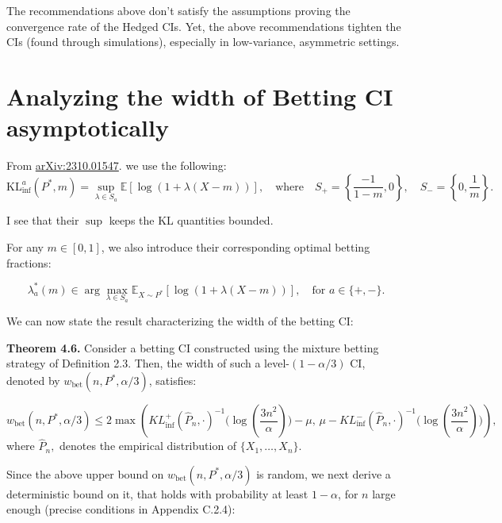 \documentclass{article}
\newcommand{\art}[1]{\begingroup\color{blue}#1\endgroup}
\renewcommand{\leq}{\leqslant}
\begin{document}
\noindent The recommendations above don't satisfy the assumptions proving the convergence rate of the Hedged CIs. Yet, the above recommendations tighten the CIs (found through simulations), especially in low-variance, asymmetric settings. 

\section{Analyzing the width of Betting CI asymptotically}

From \href{https://arxiv.org/pdf/2310.01547}{arXiv:2310.01547}. we use the following:
\setcounter{equation}{6}
\begin{equation}
\text{KL}^{a}_{\text{inf}}(P^*, m) = \sup_{\lambda \in S_a} \mathbb{E}\left[\log\left(1 + \lambda (X - m)\right)\right], \quad \text{where} \quad S_+ = \left\{ \frac{-1}{1-m},0 \right\}, \quad S_- = \left\{ 0, \frac{1}{m} \right\}.
\end{equation}

\art{I see that their $\sup$ keeps the KL quantities bounded.}

For any \( m \in [0, 1] \), we also introduce their corresponding optimal betting fractions:

\begin{equation}
\lambda^*_a(m) \in \arg \max_{\lambda \in S_a} \mathbb{E}_{X \sim P^*} \left[\log\left(1 + \lambda (X - m)\right)\right], \quad \text{for } a \in \{+, -\}. 
\end{equation}

We can now state the result characterizing the width of the betting CI:

\textbf{Theorem 4.6.} Consider a betting CI constructed using the mixture betting strategy of Definition 2.3. Then, the width of such a level-$(1 - \alpha/3)$ CI, denoted by \( w_{\text{bet}}(n, P^*, \alpha/3) \), satisfies:

\begin{equation}
w_{\text{bet}}(n, P^*, \alpha/3) \leq 2 \max \left( KL^+_{\text{inf}}(\hat{P}_n, \cdot)^{-1} \Big( \log\left( \frac{3n^2}{\alpha} \right) \Big) - \mu, \, \mu - KL^-_{\text{inf}}(\hat{P}_n, \cdot)^{-1} \Big( \log\left( \frac{3n^2}{\alpha} \right) \Big) \right)
, 
\end{equation}
where \( \hat{P}_n, \) denotes the empirical distribution of \( \{X_1, \dots, X_n\} \).

Since the above upper bound on \( w_{\text{bet}}(n, P^*, \alpha/3) \) is random, we next derive a deterministic bound on it, that holds with probability at least \( 1 - \alpha \), for \( n \) large enough (precise conditions in Appendix C.2.4):
\end{document}
